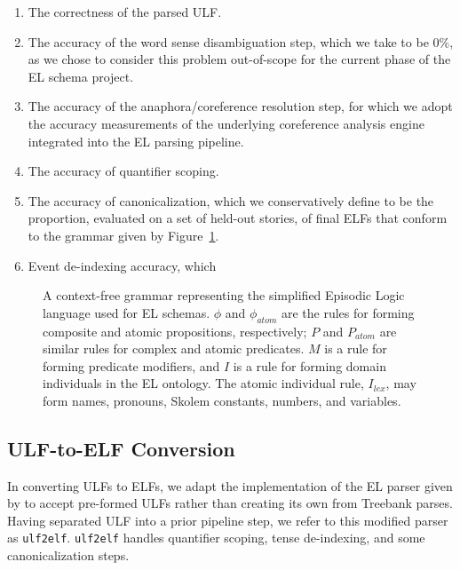 \begin{enumerate}
    \item The correctness of the parsed ULF.
    \item The accuracy of the word sense disambiguation step, which we take to be $0\%$, as we chose to consider this problem out-of-scope for the current phase of the EL schema project.
    \item The accuracy of the anaphora/coreference resolution step, for which we adopt the accuracy measurements of the underlying coreference analysis engine integrated into the EL parsing pipeline.
    \item The accuracy of quantifier scoping.
    \item The accuracy of canonicalization, which we conservatively define to be the proportion, evaluated on a set of held-out stories, of final ELFs that conform to the grammar given by Figure~\ref{fig:el_cfg}.
    \item Event de-indexing accuracy, which
\end{enumerate}

\begin{figure}
    \centering
    
    \normalsize
    \caption{A context-free grammar representing the simplified Episodic Logic language used for EL schemas. $\phi$ and $\phi_{atom}$ are the rules for forming composite and atomic propositions, respectively; $P$ and $P_{atom}$ are similar rules for complex and atomic predicates. $M$ is a rule for forming predicate modifiers, and $I$ is a rule for forming domain individuals in the EL ontology. The atomic individual rule, $I_{lex}$, may form names, pronouns, Skolem constants, numbers, and variables.}
    \label{fig:el_cfg}
\end{figure}

\subsection{ULF-to-ELF Conversion}
In converting ULFs to ELFs, we adapt the implementation of the EL parser given by \citet{schubert-2014-treebank} to accept pre-formed ULFs rather than creating its own from Treebank parses. Having separated ULF into a prior pipeline step, we refer to this modified parser as \texttt{ulf2elf}. \texttt{ulf2elf} handles quantifier scoping, tense de-indexing, and some canonicalization steps.

